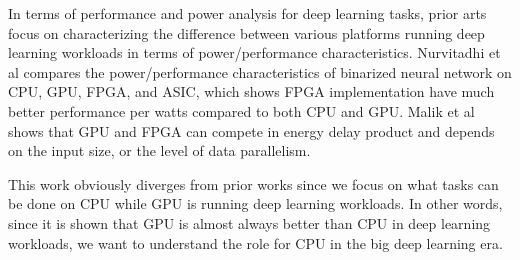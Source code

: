In terms of performance and power analysis for deep learning tasks, prior arts focus on characterizing the difference between various platforms running deep learning workloads in terms of power/performance characteristics. Nurvitadhi et al \cite{nurvitadhi2016accelerating} compares the power/performance characteristics of binarized neural network on CPU, GPU, FPGA, and ASIC, which shows FPGA implementation have much better performance per watts compared to both CPU and GPU. Malik et al \cite{malik2016architecture} shows that GPU and FPGA can compete in energy delay product and depends on the input size, or the level of data parallelism.

This work obviously diverges from prior works since we focus on what tasks can be done on CPU while GPU is running deep learning workloads. In other words, since it is shown that GPU is almost always better than CPU in deep learning workloads, we want to understand the role for CPU in the big deep learning era.